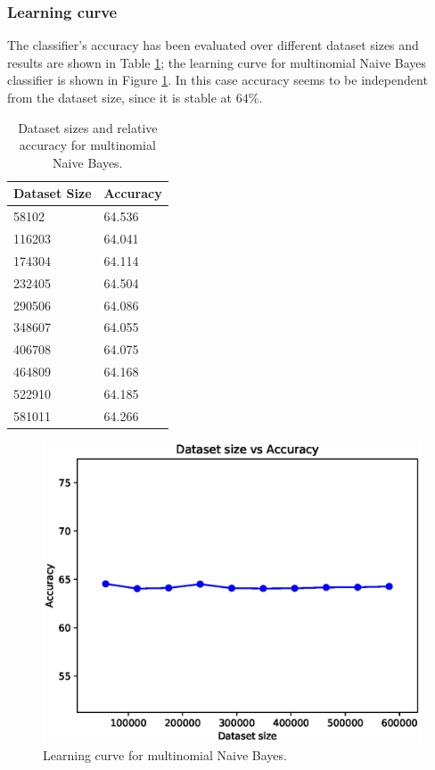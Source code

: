 \documentclass[a4paper, 10pt]{article}
\begin{document}
\subsubsection{Learning curve}
The classifier's accuracy has been evaluated over different dataset sizes and results are shown in Table \ref{tab:mnb_learning}; the learning curve for multinomial Naive Bayes classifier is shown in Figure \ref{fig:mnb_learning}. In this case accuracy seems to be independent from the dataset size, since it is stable at $64\%$.

\begin{table}[H]
\centering
\begin{tabular}{|l|l|}
\hline
\textbf{Dataset Size} & \textbf{Accuracy}\\\hline
58102 & 64.536\\\hline
116203 & 64.041\\\hline
174304 & 64.114\\\hline
232405 & 64.504\\\hline
290506 & 64.086\\\hline
348607 & 64.055\\\hline
406708 & 64.075\\\hline
464809 & 64.168\\\hline
522910 & 64.185\\\hline
581011 & 64.266\\\hline
\end{tabular}
\caption{Dataset sizes and relative accuracy for multinomial Naive Bayes.}
\label{tab:mnb_learning}
\end{table}

\begin{figure}[H]
 \centering
 \includegraphics[width=0.8\linewidth]{pictures/nb_multi_size_vs_accuracy.eps}
 \caption{Learning curve for multinomial Naive Bayes.}
 \label{fig:mnb_learning}
\end{figure}
\end{document}
